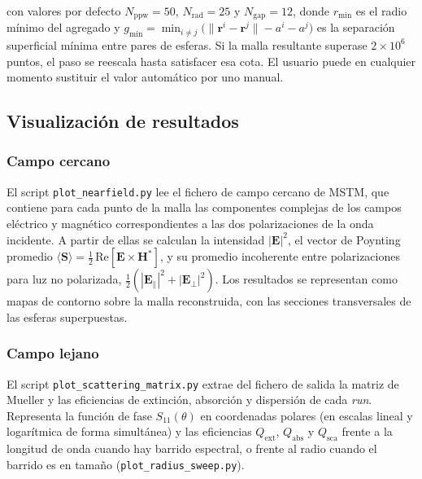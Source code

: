 con valores por defecto $N_{\text{ppw}}=50$, $N_{\text{rad}}=25$ y
$N_{\text{gap}}=12$, donde $r_{\min}$ es el radio mínimo del agregado
y $g_{\min} = \min_{i\neq j}\!\bigl(\|\mathbf{r}^i - \mathbf{r}^j\| -
a^i - a^j\bigr)$ es la separación superficial mínima entre pares de
esferas. Si la malla resultante superase $2\times 10^{6}$ puntos, el
paso se reescala hasta satisfacer esa cota. El usuario puede en
cualquier momento sustituir el valor automático por uno manual.

\subsection{Visualización de resultados}
\label{subsec:visualizacion}

\subsubsection*{Campo cercano}

El script \texttt{plot\_nearfield.py} lee el fichero de campo cercano
de MSTM, que contiene para cada punto de la malla las componentes
complejas de los campos eléctrico y magnético correspondientes a las
dos polarizaciones de la onda incidente. A partir de ellas se calculan
la intensidad $|\mathbf{E}|^2$, el vector de Poynting promedio
$\langle\mathbf{S}\rangle = \frac{1}{2}\,\mathrm{Re}
[\mathbf{E}\times\mathbf{H}^{*}]$, y su promedio incoherente entre
polarizaciones para luz no polarizada,
$\frac{1}{2}(|\mathbf{E}_{\parallel}|^2 +
|\mathbf{E}_{\perp}|^2)$. Los resultados se representan como mapas de
contorno sobre la malla reconstruida, con las secciones transversales
de las esferas superpuestas.

\subsubsection*{Campo lejano}

El script \texttt{plot\_scattering\_matrix.py} extrae del fichero de
salida la matriz de Mueller y las eficiencias de extinción, absorción y
dispersión de cada \emph{run}. Representa la función de fase
$S_{11}(\theta)$ en coordenadas polares (en escalas lineal y
logarítmica de forma simultánea) y las eficiencias $Q_{\text{ext}}$,
$Q_{\text{abs}}$ y $Q_{\text{sca}}$ frente a la longitud de onda cuando
hay barrido espectral, o frente al radio cuando el barrido es en tamaño
(\texttt{plot\_radius\_sweep.py}).

